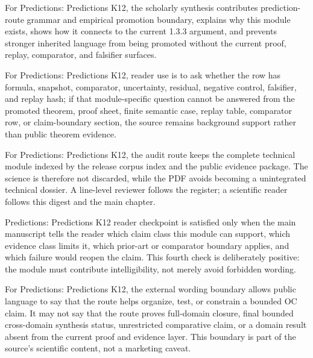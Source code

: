 For Predictions: Predictions K12, the scholarly synthesis contributes prediction-route grammar and empirical promotion boundary, explains why this module exists, shows how it connects to the current 1.3.3 argument, and prevents stronger inherited language from being promoted without the current proof, replay, comparator, and falsifier surfaces.


For Predictions: Predictions K12, reader use is to ask whether the row has formula, snapshot, comparator, uncertainty, residual, negative control, falsifier, and replay hash; if that module-specific question cannot be answered from the promoted theorem, proof sheet, finite semantic case, replay table, comparator row, or claim-boundary section, the source remains background support rather than public theorem evidence.


For Predictions: Predictions K12, the audit route keeps the complete technical module indexed by the release corpus index and the public evidence package. The science is therefore not discarded, while the PDF avoids becoming a unintegrated technical dossier. A line-level reviewer follows the register; a scientific reader follows this digest and the main chapter.


Predictions: Predictions K12 reader checkpoint is satisfied only when the main manuscript tells the reader which claim class this module can support, which evidence class limits it, which prior-art or comparator boundary applies, and which failure would reopen the claim. This fourth check is deliberately positive: the module must contribute intelligibility, not merely avoid forbidden wording.


For Predictions: Predictions K12, the external wording boundary allows public language to say that the route helps organize, test, or constrain a bounded OC claim. It may not say that the route proves full-domain closure, final bounded cross-domain synthesis status, unrestricted comparative claim, or a domain result absent from the current proof and evidence layer. This boundary is part of the source's scientific content, not a marketing caveat.
